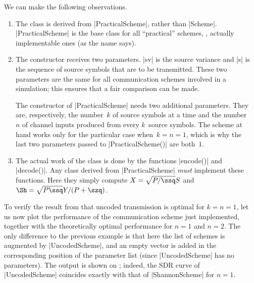 We can make the following observations.
\begin{enumerate}
  \item The class is derived from |PracticalScheme|, rather than |Scheme|.
    |PracticalScheme| is the base class for all ``practical'' schemes, \ie,
    actually implementable ones (as the name says).

  \item The constructor receives two parameters. |sv| is the source variance and
    |s| is the sequence of source symbols that are to be transmitted. These
    two parameters are the same for all communication schemes involved in a
    simulation; this ensures that a fair comparison can be made. 

    The constructor of |PracticalScheme| needs two additional parameters. They
    are, respectively, the number~$k$ of source symbols at a time and the
    number~$n$ of channel inputs produced from every $k$~source symbols. The
    scheme at hand works only for the particular case when~$k = n = 1$, which is
    why the last two parameters passed to |PracticalScheme()| are both~$1$.

  \item The actual work of the class is done by the functions |encode()| and
    |decode()|. Any class derived from |PracticalScheme| \emph{must} implement
    these functions. Here they simply compute $X = \sqrt{P/\ssq} S$ and $\Sh =
    \sqrt{P \ssq} Y / (P + \szq)$.
\end{enumerate}

To verify the result from  that uncoded transmission is optimal
for $k=n=1$, let us now plot the performance of the communication scheme just
implemented, together with the theoretically optimal performance for $n = 1$ and
$n=2$. 
The only difference to the previous example is that here the list of schemes is
augmented by |UncodedScheme|, and an empty vector is added in the corresponding
position of the parameter list (since |UncodedScheme| has no parameters). 
The output is shown on ; indeed, the SDR curve of
|UncodedScheme| coincides exactly with that of |ShannonScheme| for $n = 1$.

